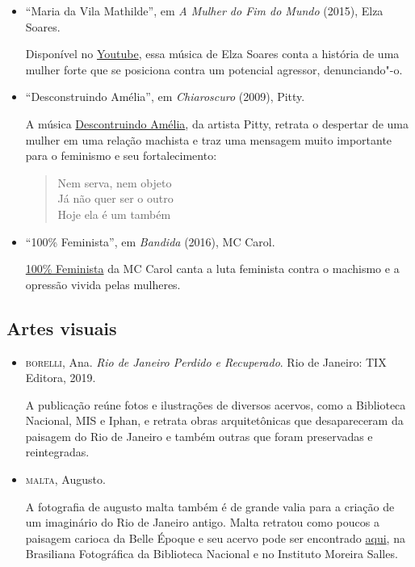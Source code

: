 \documentclass[12pt]{extarticle}
\begin{document}
\begin{itemize}
\item``Maria da Vila Mathilde'', em \emph{A Mulher do Fim do Mundo} (2015), Elza Soares.

Disponível no \href{https://www.youtube.com/watch?v=-09qfhVdzz8&ab_channel=circus}{Youtube}, 
essa música de Elza Soares conta a história de uma mulher forte que se posiciona contra 
um potencial agressor, denunciando"-o. 

\item``Desconstruindo Amélia'', em \emph{Chiaroscuro} (2009), Pitty.

A música \href{https://www.youtube.com/watch?v=ygcrcRgVxMI&ab_channel=PittyNews}{Descontruindo Amélia}, da 
artista Pitty, retrata o despertar de uma mulher em uma relação machista e 
traz uma mensagem muito importante para o feminismo e seu fortalecimento: 

\begin{verse}
Nem serva, nem objeto\\
Já não quer ser o outro\\
Hoje ela é um também\\
\end{verse}

\item``100\% Feminista'', em \emph{Bandida} (2016), MC Carol.

\href{https://www.youtube.com/watch?v=W05v0B59K5s&ab_channel=McCarolOficial}{100\% Feminista} da MC Carol canta a luta feminista 
contra o machismo e a opressão vivida pelas mulheres. 
\end{itemize}

\subsection{Artes visuais}

\begin{itemize}
\item\textsc{borelli}, Ana. \emph{Rio de Janeiro Perdido e Recuperado}. Rio de Janeiro: TIX
Editora, 2019.

A publicação reúne fotos e ilustrações de diversos acervos, como a Biblioteca Nacional, 
MIS e Iphan, e retrata obras arquitetônicas que desapareceram da paisagem do Rio de 
Janeiro e também outras que foram preservadas e reintegradas.

\item\textsc{malta}, Augusto.

A fotografia de augusto malta também é de grande valia para a criação de um imaginário 
do Rio de Janeiro antigo. Malta retratou como poucos a paisagem carioca da Belle Époque 
e seu acervo pode ser encontrado \href{http://brasilianafotografica.bn.br/?tag=augusto-malta}{aqui}, na Brasiliana Fotográfica da
Biblioteca Nacional e no Instituto Moreira Salles.
\end{itemize}
\end{document}
